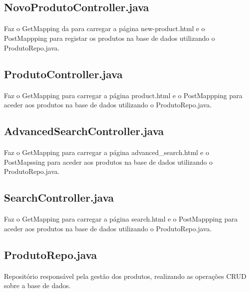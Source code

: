 \documentclass[11pt]{article}
\begin{document}
	\subsection{NovoProdutoController.java}
	\paragraph{}
	Faz o GetMapping da  para carregar a página new-product.html e o PostMappping para registar os produtos na base de dados utilizando o ProdutoRepo.java.
	
	\subsection{ProdutoController.java}
	\paragraph{}
	Faz o GetMapping para carregar a página product.html e o PostMappping para aceder aos produtos na base de dados utilizando o ProdutoRepo.java.
	
	\subsection{AdvancedSearchController.java}
	\paragraph{}
	Faz o GetMapping para carregar a página advanced_search.html e o PostMapssing para aceder aos produtos na base de dados utilizando o ProdutoRepo.java.

	\subsection{SearchController.java}
	\paragraph{}
	Faz o GetMapping para carregar a página search.html e o PostMappping para aceder aos produtos na base de dados utilizando o ProdutoRepo.java.

	\subsection{ProdutoRepo.java}
	\paragraph{}
	Repositório responsável pela gestão dos produtos, realizando as operações CRUD sobre a base de dados.
	
\end{document}
